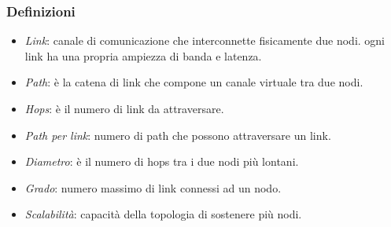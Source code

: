     \subsubsection{Definizioni}
        \begin{itemize}
            \item \textit{Link}: canale di comunicazione che interconnette fisicamente due nodi. ogni link ha una propria ampiezza di banda e latenza.
            \item \textit{Path}: è la catena di link che compone un canale virtuale tra due nodi.
            \item \textit{Hops}: è il numero di link da attraversare.
            \item \textit{Path per link}: numero di path che possono attraversare un link.
            \item \textit{Diametro}: è il numero di hops tra i due nodi più lontani.
            \item \textit{Grado}: numero massimo di link connessi ad un nodo.
            \item \textit{Scalabilità}: capacità della topologia di sostenere più nodi.
        \end{itemize}

